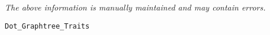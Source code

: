 \label{pkg:dot\_graphtree\_traits}

{\tiny \it The above information is manually maintained and may contain errors.}
\begin{verbatim}
Dot_Graphtree_Traits
\end{verbatim}
